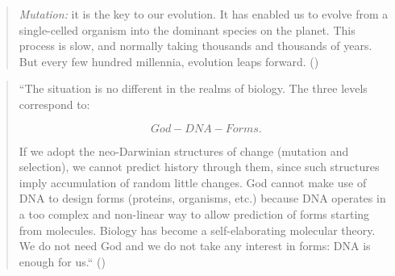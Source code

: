 \begin{quote}
\emph{Mutation:} it is the key to our evolution. It has enabled us to evolve
from a single-celled organism into the dominant species on the planet. This
process is slow, and normally taking thousands and thousands of years. But
every few hundred millennia, evolution leaps forward. (\cite{singer2000}) \end{quote}

\begin{quote}
``The situation is no different in the realms of biology. The three
levels correspond to:

\begin{equation*}
God - DNA - Forms.
\end{equation*}

If we adopt the neo-Darwinian structures of change (mutation and selection), we
cannot predict history through them, since such structures imply accumulation
of random little changes. God cannot make use of DNA to design forms (proteins,
organisms, etc.) because DNA operates in a too complex and non-linear way to
allow prediction of forms starting from molecules. Biology has become a
self-elaborating molecular theory. We do not need God and we do not take any
interest in forms: DNA is enough for us.`` (\cite{Sermonti2006})
\end{quote}

